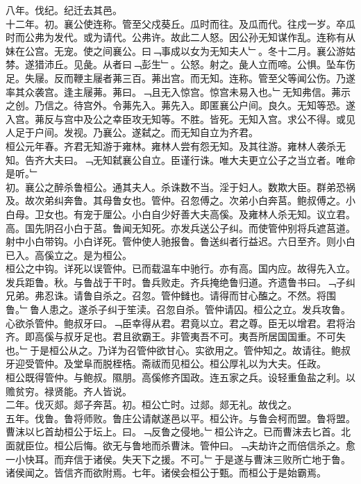 \documentclass{zhvt-classic}
\begin{document}
\hspace*{2em}八年。伐纪。纪迁去其邑。\\
\hspace*{2em}十二年。初。襄公使连称。管至父戍葵丘。瓜时而往。及瓜而代。往戍一岁。卒瓜时而公弗为发代。或为请代。公弗许。故此二人怒。因公孙无知谋作乱。连称有从妹在公宫。无宠。使之间襄公。曰﹁事成以女为无知夫人﹂。冬十二月。襄公游姑棼。遂猎沛丘。见彘。从者曰﹁彭生﹂。公怒。射之。彘人立而啼。公惧。坠车伤足。失屦。反而鞭主屦者茀三百。茀出宫。而无知。连称。管至父等闻公伤。乃遂率其众袭宫。逢主屦茀。茀曰。﹁且无入惊宫。惊宫未易入也。﹂无知弗信。茀示之创。乃信之。待宫外。令茀先入。茀先入。即匿襄公户间。良久。无知等恐。遂入宫。茀反与宫中及公之幸臣攻无知等。不胜。皆死。无知入宫。求公不得。或见人足于户间。发视。乃襄公。遂弑之。而无知自立为齐君。\\
\hspace*{2em}桓公元年春。齐君无知游于雍林。雍林人尝有怨无知。及其往游。雍林人袭杀无知。告齐大夫曰。﹁无知弑襄公自立。臣谨行诛。唯大夫更立公子之当立者。唯命是听。﹂\\
\hspace*{2em}初。襄公之醉杀鲁桓公。通其夫人。杀诛数不当。淫于妇人。数欺大臣。群弟恐祸及。故次弟纠奔鲁。其母鲁女也。管仲。召忽傅之。次弟小白奔莒。鲍叔傅之。小白母。卫女也。有宠于厘公。小白自少好善大夫高傒。及雍林人杀无知。议立君。高。国先阴召小白于莒。鲁闻无知死。亦发兵送公子纠。而使管仲别将兵遮莒道。射中小白带钩。小白详死。管仲使人驰报鲁。鲁送纠者行益迟。六日至齐。则小白已入。高傒立之。是为桓公。\\
\hspace*{2em}桓公之中钩。详死以误管仲。已而载温车中驰行。亦有高。国内应。故得先入立。发兵距鲁。秋。与鲁战于干时。鲁兵败走。齐兵掩绝鲁归道。齐遗鲁书曰。﹁子纠兄弟。弗忍诛。请鲁自杀之。召忽。管仲雠也。请得而甘心醢之。不然。将围鲁。﹂鲁人患之。遂杀子纠于笙渎。召忽自杀。管仲请囚。桓公之立。发兵攻鲁。心欲杀管仲。鲍叔牙曰。﹁臣幸得从君。君竟以立。君之尊。臣无以增君。君将治齐。即高傒与叔牙足也。君且欲霸王。非管夷吾不可。夷吾所居国国重。不可失也。﹂于是桓公从之。乃详为召管仲欲甘心。实欲用之。管仲知之。故请往。鲍叔牙迎受管仲。及堂阜而脱桎梏。斋祓而见桓公。桓公厚礼以为大夫。任政。\\
\hspace*{2em}桓公既得管仲。与鲍叔。隰朋。高傒修齐国政。连五家之兵。设轻重鱼盐之利。以赡贫穷。禄贤能。齐人皆说。\\
\hspace*{2em}二年。伐灭郯。郯子奔莒。初。桓公亡时。过郯。郯无礼。故伐之。\\
\hspace*{2em}五年。伐鲁。鲁将师败。鲁庄公请献遂邑以平。桓公许。与鲁会柯而盟。鲁将盟。曹沫以匕首劫桓公于坛上。曰。﹁反鲁之侵地。﹂桓公许之。已而曹沫去匕首。北面就臣位。桓公后悔。欲无与鲁地而杀曹沫。管仲曰。﹁夫劫许之而倍信杀之。愈一小快耳。而弃信于诸侯。失天下之援。不可。﹂于是遂与曹沫三败所亡地于鲁。诸侯闻之。皆信齐而欲附焉。七年。诸侯会桓公于甄。而桓公于是始霸焉。\\
\end{document}
